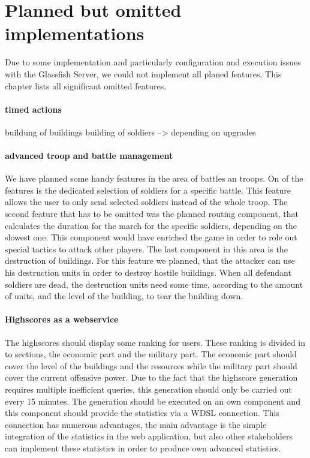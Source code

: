\documentclass[a4paper]{article}
\begin{document}

\section{Planned but omitted implementations}
Due to some implementation and particularly configuration and execution issues with the Glassfish Server, we could not implement all planed features. This chapter lists all significant omitted features.

\paragraph{timed actions}


buildung of buildings
building of soldiers --> depending on upgrades



\paragraph{advanced troop and battle management}
We have planned some handy features in the area of battles an troops. On of the features is the dedicated selection of soldiers for a specific battle. This feature  allows the user to only send selected soldiers instead of the whole troop. The second feature that has to be omitted was the planned routing component, that calculates the duration for the march for the specific soldiers, depending on the slowest one. This component would have enriched the game in order to role out special tactics to attack other players. The last component in this area is the destruction of buildings. For this feature we planned, that the attacker can use his destruction units in order to destroy hostile buildings. When all defendant soldiers are dead, the destruction units need some time, according to the amount of units, and the level of the building, to tear the building down.

\paragraph{Highscores as a webservice}
The highscores should display some ranking for users. These ranking is divided in to sections, the economic part and the military part. The economic part should cover the level of the buildings and the resources while the military part should cover the current offensive power. Due to the fact that the highscore generation requires multiple inefficient queries, this generation should only be carried out every 15 minutes. The generation should be executed on an own component and this component should provide the statistics via a WDSL connection. This connection has numerous advantages, the main advantage is the simple integration of the statistics in the web application, but also other stakeholders can implement these statistics in order to produce own advanced statistics.
\end{document}
